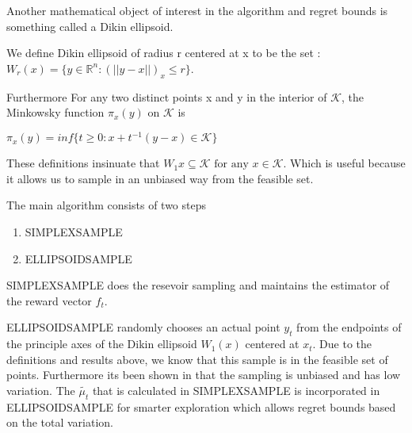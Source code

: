 Another mathematical object of interest in the algorithm
and regret bounds is something called a Dikin ellipsoid.

We define Dikin ellipsoid of radius r centered at x to be the set :
$W_r(x) = \{ y \in  \mathbb{R}^n : (||y - x||)_x \leq r \}$.

Furthermore For any two distinct points x and y in the interior of $\mathcal{K}$,   the Minkowsky
function $\pi_x(y)$ on $\mathcal{K}$ is 

$\pi_x(y) = inf \{t \geq 0 : x + t^{-1}(y - x) \in \mathcal{K} \}$

These definitions insinuate that $W_1{x} \subseteq \mathcal{K} \text{ for any } x \in \mathcal{K}$. Which 
is useful because it allows us  to sample in an unbiased way from the feasible set.

The main algorithm consists of two steps 
\begin{enumerate}
\item
  SIMPLEXSAMPLE
\item
  ELLIPSOIDSAMPLE
\end{enumerate}

SIMPLEXSAMPLE does the resevoir sampling and maintains the estimator of the reward vector
$f_t$. 

ELLIPSOIDSAMPLE randomly chooses an actual point $y_t$ from the endpoints of the
principle axes of the Dikin ellipsoid $W_1(x)$ centered at $x_t$. Due to the definitions and 
results above, we know that this sample is in the feasible set of points. Furthermore its been shown in \citep{abernethy} that the sampling is unbiased and has low variation.
The  $\tilde{\mu_t}$ that is calculated in SIMPLEXSAMPLE is incorporated in ELLIPSOIDSAMPLE for smarter exploration which allows regret bounds based on the total
variation. 
